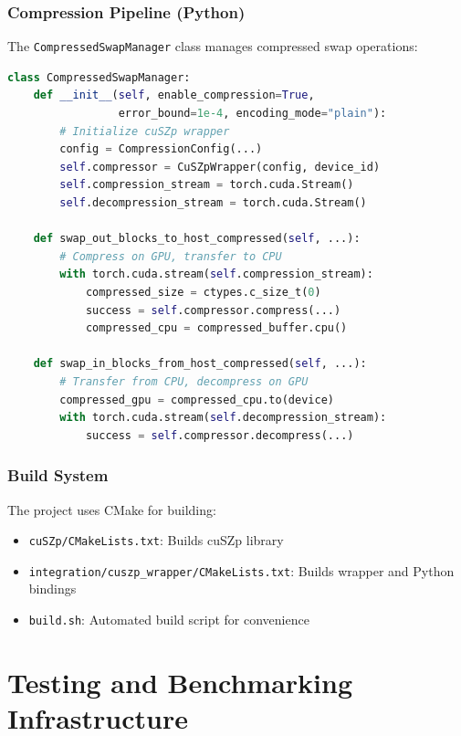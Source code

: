\documentclass{polyu-comp}
\begin{document}
\subsection{Compression Pipeline (Python)}

The \texttt{CompressedSwapManager} class manages compressed swap operations:

\begin{lstlisting}[language=Python, caption=CompressedSwapManager Core Methods]
class CompressedSwapManager:
    def __init__(self, enable_compression=True, 
                 error_bound=1e-4, encoding_mode="plain"):
        # Initialize cuSZp wrapper
        config = CompressionConfig(...)
        self.compressor = CuSZpWrapper(config, device_id)
        self.compression_stream = torch.cuda.Stream()
        self.decompression_stream = torch.cuda.Stream()
    
    def swap_out_blocks_to_host_compressed(self, ...):
        # Compress on GPU, transfer to CPU
        with torch.cuda.stream(self.compression_stream):
            compressed_size = ctypes.c_size_t(0)
            success = self.compressor.compress(...)
            compressed_cpu = compressed_buffer.cpu()
    
    def swap_in_blocks_from_host_compressed(self, ...):
        # Transfer from CPU, decompress on GPU
        compressed_gpu = compressed_cpu.to(device)
        with torch.cuda.stream(self.decompression_stream):
            success = self.compressor.decompress(...)
\end{lstlisting}

\subsection{Build System}

The project uses CMake for building:

\begin{itemize}
    \item \texttt{cuSZp/CMakeLists.txt}: Builds cuSZp library
    \item \texttt{integration/cuszp\_wrapper/CMakeLists.txt}: Builds wrapper and Python bindings
    \item \texttt{build.sh}: Automated build script for convenience
\end{itemize}


\chapter{Testing and Benchmarking Infrastructure}
\end{document}
